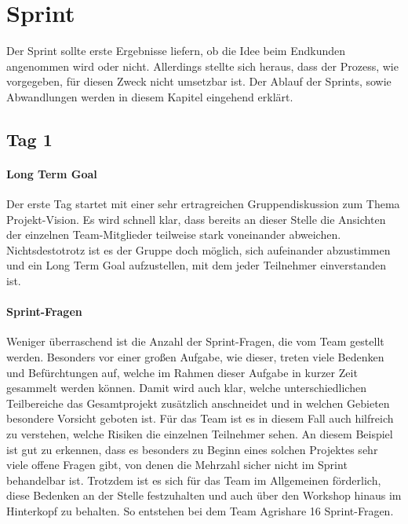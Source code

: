 \section{Sprint}
\label{sec:Sprint-Umsetzung}
Der Sprint sollte erste Ergebnisse liefern, ob die Idee beim Endkunden angenommen wird oder nicht. Allerdings stellte sich heraus, dass der Prozess, wie vorgegeben, für diesen Zweck nicht umsetzbar ist. Der Ablauf der Sprints, sowie Abwandlungen werden in diesem Kapitel eingehend erklärt.
\subsection*{\label{sec:Sprint-Umsetzung-Tag1}\thesubsection\quad Tag 1}
\paragraph{Long Term Goal}
Der erste Tag startet mit einer sehr ertragreichen Gruppendiskussion zum Thema Projekt-Vision. Es wird schnell klar, dass bereits an dieser Stelle die Ansichten der einzelnen Team-Mitglieder teilweise stark voneinander abweichen. Nichtsdestotrotz ist es der Gruppe doch möglich, sich aufeinander abzustimmen und ein Long Term Goal aufzustellen, mit dem jeder Teilnehmer einverstanden ist.
%
%
\paragraph{Sprint-Fragen}
Weniger überraschend ist die Anzahl der Sprint-Fragen, die vom Team gestellt werden. Besonders vor einer großen Aufgabe, wie dieser, treten viele Bedenken und Befürchtungen auf, welche im Rahmen dieser Aufgabe in kurzer Zeit gesammelt werden können. Damit wird auch klar, welche unterschiedlichen Teilbereiche das Gesamtprojekt zusätzlich anschneidet und in welchen Gebieten besondere Vorsicht geboten ist. Für das Team ist es in diesem Fall auch hilfreich zu verstehen, welche Risiken die einzelnen Teilnehmer sehen. An diesem Beispiel ist gut zu erkennen, dass es besonders zu Beginn eines solchen Projektes sehr viele offene Fragen gibt, von denen die Mehrzahl sicher nicht im Sprint behandelbar ist. Trotzdem ist es sich für das Team im Allgemeinen förderlich, diese Bedenken an der Stelle festzuhalten und auch über den Workshop hinaus im Hinterkopf zu behalten. So entstehen bei dem Team Agrishare 16 Sprint-Fragen.

